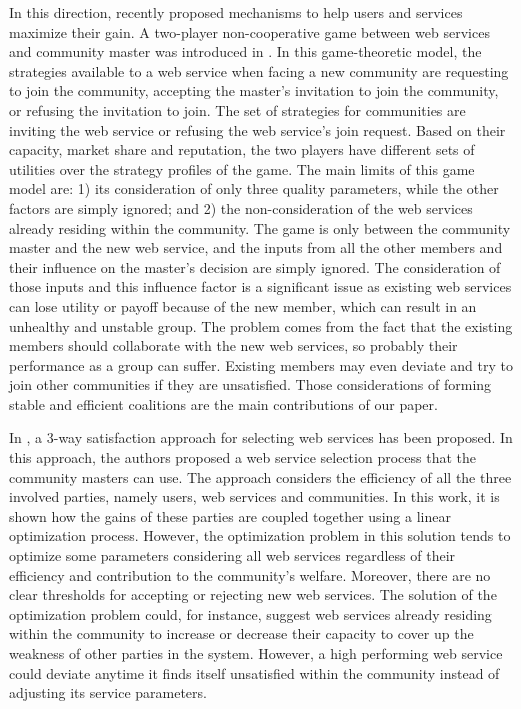 \documentclass[10pt,journal,cspaper,compsoc]{IEEEtran}
\begin{document}
In this direction, recently \cite{DBLP:conf/IEEEscc/LimTMB12,
DBLP:conf/IEEEscc/KhosravifarABT11, 10.1109/TSC.2012.12} proposed
mechanisms to help users and services maximize their gain. A
two-player non-cooperative game between web services and community
master was introduced in
\cite{DBLP:conf/IEEEscc/KhosravifarABT11}. In this game-theoretic
model, the strategies available to a web service when facing a new
community are requesting to join the community, accepting the
master's invitation to join the community, or refusing the
invitation to join. The set of strategies for communities are
inviting the web service or refusing the web service's join
request. Based on their capacity, market share and reputation, the
two players have different sets of utilities over the strategy
profiles of the game. The main limits of this game model are: 1)
its consideration of only three quality parameters, while the
other factors are simply ignored; and 2) the non-consideration of
the web services already residing within the community. The game
is only between the community master and the new web service, and
the inputs from all the other members and their influence on the
master's decision are simply ignored. The consideration of those
inputs and this influence factor is a significant issue as
existing web services can lose utility or payoff because of the
new member, which can result in an unhealthy and unstable group.
The problem comes from the fact that the existing members should
collaborate with the new web services, so probably their
performance as a group can suffer. Existing members may even
deviate and try to join other communities if they are unsatisfied.
Those considerations of forming stable and efficient coalitions
are the main contributions of our paper.

In \cite{DBLP:conf/IEEEscc/LimTMB12}, a 3-way satisfaction approach
for selecting web services has been proposed. In this approach,
the authors proposed a web service selection process that the
community masters can use. The approach considers the efficiency
of all the three involved parties, namely users, web services and
communities. In this work, it is shown how the gains of these
parties are coupled together using a linear optimization process.
However, the optimization problem in this solution tends to
optimize some parameters considering all web services regardless
of their efficiency and contribution to the community's welfare.
Moreover, there are no clear thresholds for accepting or rejecting
new web services. The solution of the optimization problem could,
for instance, suggest web services already residing within the
community to increase or decrease their capacity to cover up the
weakness of other parties in the system. However, a high
performing web service could deviate anytime it finds itself
unsatisfied within the community instead of adjusting its service
parameters.
\end{document}

